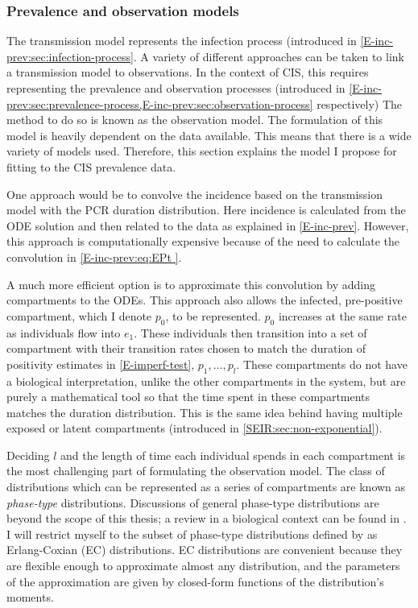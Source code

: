 \documentclass[thesis.tex]{subfiles}
\begin{document}
\subsubsection{Prevalence and observation models} \label{SEIR:sec:observation}

The transmission model represents the infection process (introduced in \cref{E-inc-prev:sec:infection-process}.
A variety of different approaches can be taken to link a transmission model to observations.
In the context of CIS, this requires representing the prevalence and observation processes (introduced in \cref{E-inc-prev:sec:prevalence-process,E-inc-prev:sec:observation-process} respectively)
The method to do so is known as the observation model.
The formulation of this model is heavily dependent on the data available.
This means that there is a wide variety of models used.
Therefore, this section  explains the model I propose for fitting to the CIS prevalence data.

One approach would be to convolve the incidence based on the transmission model with the PCR duration distribution.
Here incidence is calculated from the ODE solution and then related to the data as explained in \cref{E-inc-prev}.
However, this approach is computationally expensive because of the need to calculate the convolution in \cref{E-inc-prev:eq:EPt }.

A much more efficient option is to approximate this convolution by adding compartments to the ODEs.
This approach also allows the infected, pre-positive compartment, which I denote $p_0$, to be represented.
$p_0$ increases at the same rate as individuals flow into $e_1$.
These individuals then transition into a set of compartment with their transition rates chosen to match the duration of positivity estimates in \cref{E-imperf-test}, $p_1, \dots, p_l$.
These compartments do not have a biological interpretation, unlike the other compartments in the system, but are purely a mathematical tool so that the time spent in these compartments matches the duration distribution.
This is the same idea behind having multiple exposed or latent compartments (introduced in \cref{SEIR:sec:non-exponential}).

Deciding $l$ and the length of time each individual spends in each compartment is the most challenging part of formulating the observation model.
The class of distributions which can be represented as a series of compartments are known as \emph{phase-type} distributions.
Discussions of general phase-type distributions are beyond the scope of this thesis; a review in a biological context can be found in \textcite{hobolthPhasetype}.
I will restrict myself to the subset of phase-type distributions defined by \textcite{osogamiClosed} as Erlang-Coxian (EC) distributions.
EC distributions are convenient because they are flexible enough to approximate almost any distribution, and the parameters of the approximation are given by closed-form functions of the distribution's moments.
\end{document}

